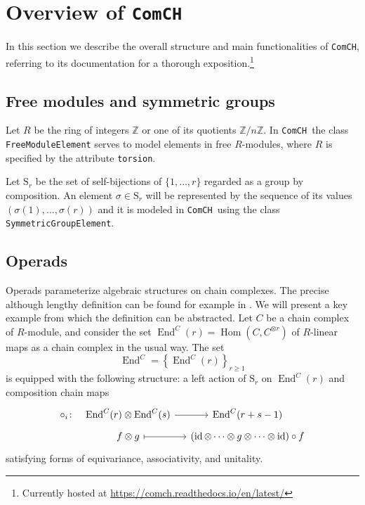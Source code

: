 \documentclass{amsart}
\renewcommand{\S}{\mathrm{S}}
\newcommand{\comch}{\texttt{ComCH}}
\DeclareMathOperator{\id}{id}
\DeclareMathOperator{\Hom}{Hom}
\DeclareMathOperator{\End}{End}
\begin{document}
\tableofcontents

\section{Overview of \comch} \label{s: overview}
In this section we describe the overall structure and main functionalities of \comch, referring to its documentation for a thorough exposition.\footnote{Currently hosted at \url{https://comch.readthedocs.io/en/latest/}}

\subsection{Free modules and symmetric groups}

Let $R$ be the ring of integers $\mathbb Z$ or one of its quotients $\mathbb Z / n \mathbb Z$.
In \comch\, the class \texttt{FreeModuleElement} serves to model elements in free $R$-modules, where $R$ is specified by the attribute \texttt{torsion}.

Let $\S_r$ be the set of self-bijections of $\{1, \dots, r\}$ regarded as a group by composition.
An element $\sigma \in \S_r$ will be represented by the sequence of its values $(\sigma(1), \dots, \sigma(r))$ and it is modeled in \comch\, using the class \texttt{SymmetricGroupElement}.

\subsection{Operads}

Operads parameterize algebraic structures on chain complexes.
The precise although lengthy definition can be found for example in \cite{Markl08}.
We will present a key example from which the definition can be abstracted.
Let $C$ be a chain complex of $R$-module, and consider the set $\End^C(r) =  \Hom(C, C^{\otimes r})$ of $R$-linear maps as a chain complex in the usual way.
The set 
\begin{equation*}
\End^C = \left\{\End^C(r)\right\}_{r \geq 1}
\end{equation*}
is equipped with the following structure: a left action of $\S_r$ on $\End^C(r)$ and composition chain maps
\begin{equation*}
\begin{tikzcd}[column sep=small, row sep=tiny]
\circ_i \colon &[-10pt] \End^C(r) \otimes \End^C(s) \arrow[r] & \End^C(r+s-1) \\
& f \otimes g \arrow[r, |->] & (\id \otimes \cdots \otimes g \otimes \cdots \otimes \id) \circ f 
\end{tikzcd}
\end{equation*}
satisfying forms of equivariance, associativity, and unitality.
\end{document}
